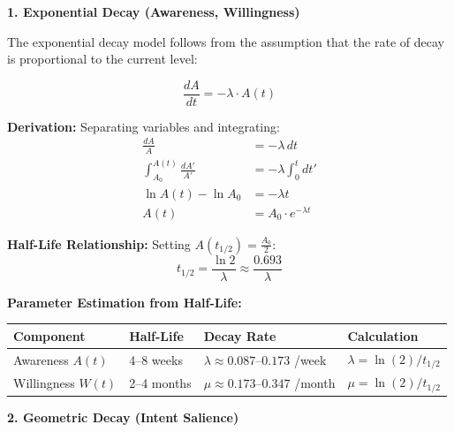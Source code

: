 \documentclass[11pt, a4paper]{article}
\begin{document}
\begin{tcolorbox}[colback=white, colframe=black!75!black,
    title=\textbf{Mathematical Derivation: NTM Decay Functions}]

\textbf{1. Exponential Decay (Awareness, Willingness)}

The exponential decay model follows from the assumption that the rate of decay is proportional to the current level:

\begin{equation}
\frac{dA}{dt} = -\lambda \cdot A(t)
\label{eq:awareness-ode}
\end{equation}

\textbf{Derivation:} Separating variables and integrating:
\begin{align}
\frac{dA}{A} &= -\lambda \, dt \\
\int_{A_0}^{A(t)} \frac{dA'}{A'} &= -\lambda \int_0^t dt' \\
\ln A(t) - \ln A_0 &= -\lambda t \\
A(t) &= A_0 \cdot e^{-\lambda t}
\end{align}

\textbf{Half-Life Relationship:} Setting $A(t_{1/2}) = \frac{A_0}{2}$:
\begin{equation}
t_{1/2} = \frac{\ln 2}{\lambda} \approx \frac{0.693}{\lambda}
\label{eq:half-life}
\end{equation}

\textbf{Parameter Estimation from Half-Life:}
\begin{center}
\renewcommand{\arraystretch}{1.3}
\begin{tabular}{@{}llll@{}}
\toprule
\textbf{Component} & \textbf{Half-Life} & \textbf{Decay Rate} & \textbf{Calculation} \\
\midrule
Awareness $A(t)$ & 4--8 weeks & $\lambda \approx 0.087$--$0.173$ /week & $\lambda = \ln(2)/t_{1/2}$ \\
Willingness $W(t)$ & 2--4 months & $\mu \approx 0.173$--$0.347$ /month & $\mu = \ln(2)/t_{1/2}$ \\
\bottomrule
\end{tabular}
\end{center}

\vspace{0.5em}
\textbf{2. Geometric Decay (Intent Salience)}


\end{tcolorbox}
\end{document}
